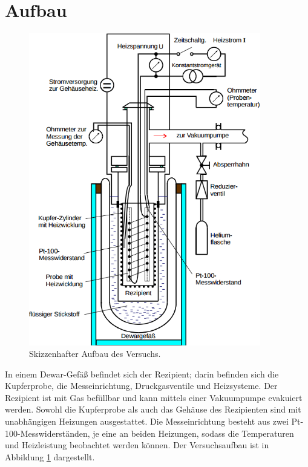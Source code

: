\section{Aufbau}
\begin{figure}
	\centering
	\includegraphics[width=0.9\textwidth,]{graphics/aufbau.png}
	\caption{Skizzenhafter Aufbau des Versuchs. \cite{skript}}
	\label{fig:aufbau}
\end{figure}
In einem Dewar-Gefäß befindet sich der Rezipient; 
darin befinden sich die Kupferprobe, die Messeinrichtung, Druckgasventile und Heizsysteme.
Der Rezipient ist mit Gas befüllbar und kann mittels einer Vakuumpumpe evakuiert werden. 
Sowohl die Kupferprobe als auch das Gehäuse des Rezipienten sind mit unabhängigen Heizungen ausgestattet.
Die Messeinrichtung besteht aus zwei Pt-100-Messwiderständen, 
je eine an beiden Heizungen, 
sodass die Temperaturen und Heizleistung beobachtet werden können.
Der Versuchsaufbau ist in Abbildung \ref{fig:aufbau} dargestellt.


